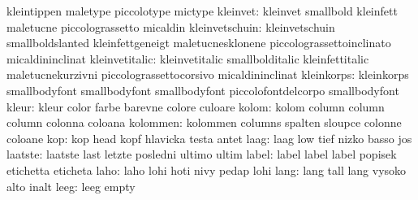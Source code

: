                            kleintippen               maletype
                           piccolotype               mictype
                 kleinvet: kleinvet                  smallbold
                           kleinfett                 maletucne
                           piccolograssetto          micaldin
           kleinvetschuin: kleinvetschuin            smallboldslanted
                           kleinfettgeneigt          maletucnesklonene
                           piccolograssettoinclinato micaldininclinat
           kleinvetitalic: kleinvetitalic            smallbolditalic
                           kleinfettitalic           maletucnekurzivni
                           piccolograssettocorsivo   micaldininclinat
               kleinkorps: kleinkorps                smallbodyfont
                           smallbodyfont             smallbodyfont
                           piccolofontdelcorpo       smallbodyfont %
                    kleur: kleur                     color
                           farbe                     barevne
                           colore                    culoare
                    kolom: kolom                     column
                           column                    column
                           colonna                   coloana %
                 kolommen: kolommen                  columns
                           spalten                   sloupce
                           colonne                   coloane
                      kop: kop                       head
                           kopf                      hlavicka
                           testa                     antet %
                     laag: laag                      low
                           tief                      nizko
                           basso                     jos
                  laatste: laatste                   last
                           letzte                    posledni
                           ultimo                    ultim
                    label: label                     label
                           label                     popisek
                           etichetta                 eticheta
                     laho: laho                      lohi
                           hoti                      nivy
                           pedap                     lohi %
                     lang: lang                      tall
                           lang                      vysoko
                           alto                      inalt %
                     leeg: leeg                      empty
